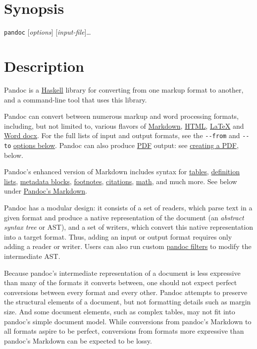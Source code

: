 \hypertarget{synopsis}{%
\section{Synopsis}\label{synopsis}}

\texttt{pandoc} {[}\emph{options}{]} {[}\emph{input-file}{]}\ldots{}

\hypertarget{description}{%
\section{Description}\label{description}}

Pandoc is a \href{https://www.haskell.org}{Haskell} library for
converting from one markup format to another, and a command-line tool
that uses this library.

Pandoc can convert between numerous markup and word processing formats,
including, but not limited to, various flavors of
\href{https://daringfireball.net/projects/markdown/}{Markdown},
\href{https://www.w3.org/html/}{HTML},
\href{https://www.latex-project.org/}{LaTeX} and
\href{https://en.wikipedia.org/wiki/Office_Open_XML}{Word docx}. For the
full lists of input and output formats, see the \texttt{-\/-from} and
\texttt{-\/-to} \protect\hyperlink{general-options-1}{options below}.
Pandoc can also produce \href{https://www.adobe.com/pdf/}{PDF} output:
see \protect\hyperlink{creating-a-pdf}{creating a PDF}, below.

Pandoc's enhanced version of Markdown includes syntax for
\protect\hyperlink{tables}{tables},
\protect\hyperlink{definition-lists}{definition lists},
\protect\hyperlink{metadata-blocks}{metadata blocks},
\protect\hyperlink{footnotes}{footnotes},
\protect\hyperlink{citations}{citations},
\protect\hyperlink{math}{math}, and much more. See below under
\protect\hyperlink{pandocs-markdown}{Pandoc's Markdown}.

Pandoc has a modular design: it consists of a set of readers, which
parse text in a given format and produce a native representation of the
document (an \emph{abstract syntax tree} or AST), and a set of writers,
which convert this native representation into a target format. Thus,
adding an input or output format requires only adding a reader or
writer. Users can also run custom
\href{https://pandoc.org/filters.html}{pandoc filters} to modify the
intermediate AST.

Because pandoc's intermediate representation of a document is less
expressive than many of the formats it converts between, one should not
expect perfect conversions between every format and every other. Pandoc
attempts to preserve the structural elements of a document, but not
formatting details such as margin size. And some document elements, such
as complex tables, may not fit into pandoc's simple document model.
While conversions from pandoc's Markdown to all formats aspire to be
perfect, conversions from formats more expressive than pandoc's Markdown
can be expected to be lossy.


